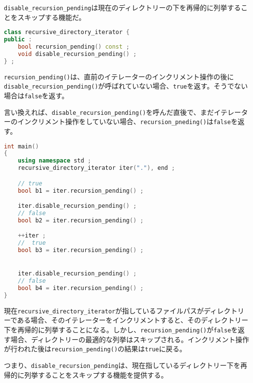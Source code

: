 \lstinline!disable_recursion_pending!は現在のディレクトリーの下を再帰的に列挙することをスキップする機能だ。

\begin{lstlisting}[language=C++]
class recursive_directory_iterator {
public :
    bool recursion_pending() const ;
    void disable_recursion_pending() ;
} ;
\end{lstlisting}

\lstinline!recursion_pending()!は、直前のイテレーターのインクリメント操作の後に\lstinline!disable_recursion_pending()!が呼ばれていない場合、\lstinline!true!を返す。そうでない場合は\lstinline!false!を返す。

言い換えれば、\lstinline!disable_recursion_pending()!を呼んだ直後で、まだイテレーターのインクリメント操作をしていない場合、\lstinline!recursion_pneding()!は\lstinline!false!を返す。

\begin{lstlisting}[language=C++]
int main()
{
    using namespace std ;
    recursive_directory_iterator iter("."), end ;

    // true
    bool b1 = iter.recursion_pending() ;

    iter.disable_recursion_pending() ;
    // false
    bool b2 = iter.recursion_pending() ;

    ++iter ;
    //  true
    bool b3 = iter.recursion_pending() ;


    iter.disable_recursion_pending() ;
    // false
    bool b4 = iter.recursion_pending() ;
}
\end{lstlisting}

現在\lstinline!recursive_directory_iterator!が指しているファイルパスがディレクトリーである場合、そのイテレーターをインクリメントすると、そのディレクトリー下を再帰的に列挙することになる。しかし、\lstinline!recursion_pending()!が\lstinline!false!を返す場合、ディレクトリーの最適的な列挙はスキップされる。インクリメント操作が行われた後は\lstinline!recursion_pending()!の結果は\lstinline!true!に戻る。

つまり、\lstinline!disable_recursion_pending!は、現在指しているディレクトリー下を再帰的に列挙することをスキップする機能を提供する。

